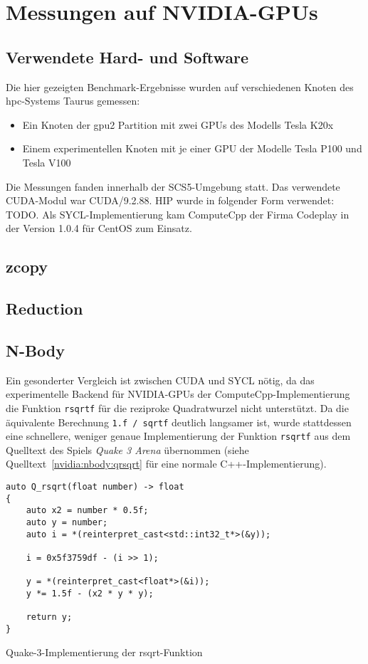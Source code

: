 \section{Messungen auf NVIDIA-GPUs}
\label{nvidia}

\subsection{Verwendete Hard- und Software}

Die hier gezeigten Benchmark-Ergebnisse wurden auf verschiedenen Knoten des
\gls{hpc}-Systems Taurus gemessen:

\begin{itemize}
    \item Ein Knoten der gpu2 Partition mit zwei GPUs des Modells Tesla K20x
    \item Einem experimentellen Knoten mit je einer GPU der Modelle Tesla P100
          und Tesla V100
\end{itemize}

Die Messungen fanden innerhalb der SCS5-Umgebung statt. Das verwendete
CUDA-Modul war CUDA/9.2.88. HIP wurde in folgender Form verwendet: TODO. Als
SYCL-Implementierung kam ComputeCpp der Firma Codeplay in der Version 1.0.4 für
CentOS zum Einsatz.

\subsection{zcopy}

\subsection{Reduction}

\subsection{N-Body}

Ein gesonderter Vergleich ist zwischen CUDA und SYCL nötig, da das
experimentelle Backend für NVIDIA-GPUs der ComputeCpp-Implementierung die
Funktion \texttt{rsqrtf} für die reziproke Quadratwurzel nicht unterstützt. Da
die äquivalente Berechnung \texttt{1.f / sqrtf} deutlich langsamer ist, wurde
stattdessen eine schnellere, weniger genaue Implementierung der Funktion
\texttt{rsqrtf} aus dem Quelltext des Spiels \textit{Quake 3 Arena} übernommen
(siehe Quelltext~\ref{nvidia:nbody:qrsqrt} für eine normale
C++-Implementierung).

\begin{code}
    \begin{verbatim}
auto Q_rsqrt(float number) -> float
{
    auto x2 = number * 0.5f;
    auto y = number;
    auto i = *(reinterpret_cast<std::int32_t*>(&y));

    i = 0x5f3759df - (i >> 1);

    y = *(reinterpret_cast<float*>(&i));
    y *= 1.5f - (x2 * y * y);

    return y;
}
    \end{verbatim}
    \caption{Quake-3-Implementierung der rsqrt-Funktion}
    \label{nvidia:nbody:qrsqrt}
\end{code}
